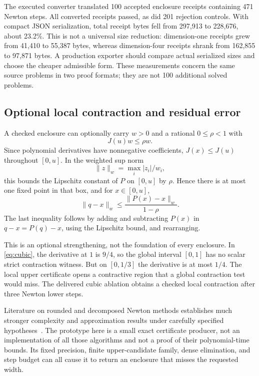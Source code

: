 The executed converter translated 100 accepted enclosure receipts containing 471 Newton steps. All converted receipts passed, as did 201 rejection controls. With compact JSON serialization, total receipt bytes fell from 297,913 to 228,676, about 23.2\%. This is not a universal size reduction: dimension-one receipts grew from 41,410 to 55,387 bytes, whereas dimension-four receipts shrank from 162,855 to 97,871 bytes. A production exporter should compare actual serialized sizes and choose the cheaper admissible form. These measurements concern the same source problems in two proof formats; they are not 100 additional solved problems.

\subsection{Optional local contraction and residual error}
A checked enclosure can optionally carry $w>0$ and a rational $0\le\rho<1$ with
\begin{equation}
 \label{eq:contraction}
 J(u)w\le\rho w.
\end{equation}
Since polynomial derivatives have nonnegative coefficients, $J(x)\le J(u)$ throughout $[0,u]$. In the weighted sup norm
\[
 \|z\|_w=\max_i |z_i|/w_i,
\]
this bounds the Lipschitz constant of $P$ on $[0,u]$ by $\rho$. Hence there is at most one fixed point in that box, and for $x\in[0,u]$,
\[
 \|q-x\|_w\le\frac{\|P(x)-x\|_w}{1-\rho}.
\]
The last inequality follows by adding and subtracting $P(x)$ in $q-x=P(q)-x$, using the Lipschitz bound, and rearranging.

This is an optional strengthening, not the foundation of every enclosure. In \eqref{eq:cubic}, the derivative at $1$ is $9/4$, so the global interval $[0,1]$ has no scalar strict contraction witness. But on $[0,1/3]$ the derivative is at most $1/4$. The local upper certificate opens a contractive region that a global contraction test would miss. The delivered cubic ablation obtains a checked local contraction after three Newton lower steps.

Literature on rounded and decomposed Newton methods establishes much stronger complexity and approximation results under carefully specified hypotheses~\cite{esparza-kiefer-luttenberger,etessami-stewart-yannakakis,stewart-etessami-yannakakis}. The prototype here is a small exact certificate producer, not an implementation of all those algorithms and not a proof of their polynomial-time bounds. Its fixed precision, finite upper-candidate family, dense elimination, and step budget can all cause it to return an enclosure that misses the requested width.

